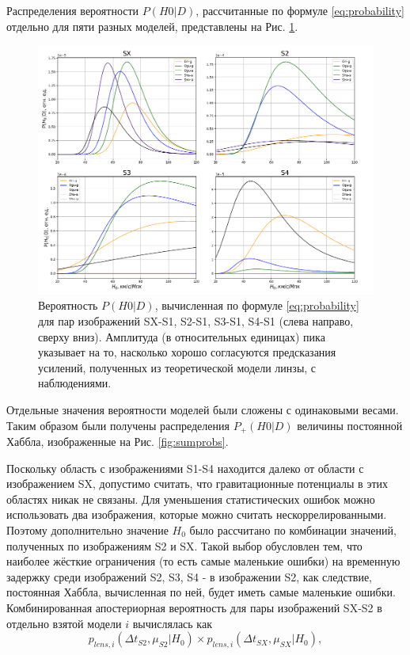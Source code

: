 Распределения вероятности $P( H0 |D)$, рассчитанные по формуле \ref{eq:probability} отдельно для пяти разных моделей, представлены на Рис. \ref{fig:probs}. 

\begin{figure}[H]
    \centering
	\includegraphics[width=0.99\linewidth]{pics/SX234.png}
	\caption{Вероятность $P( H0 |D)$, вычисленная по формуле \eqref{eq:probability} для пар изображений SX-S1, S2-S1, S3-S1, S4-S1 (слева направо, сверху вниз). Амплитуда (в относительных единицах) пика указывает на то, насколько хорошо согласуются предсказания усилений, полученных из теоретической модели линзы, с наблюдениями.}
	\label{fig:probs}
\end{figure}

Отдельные значения вероятности моделей были сложены с одинаковыми весами. Таким образом были получены распределения $P_+( H0 |D)$ величины постоянной Хаббла, изображенные на Рис. \ref{fig:sumprobs}.

Поскольку область с изображениями S1-S4 находится далеко от области с изображением SX, допустимо считать, что гравитационные потенциалы в этих областях никак не связаны. Для уменьшения статистических ошибок можно использовать два изображения, которые можно считать нескоррелированными. Поэтому дополнительно значение $H_0$ было рассчитано по комбинации значений, полученных по изображениям S2 и SX. Такой выбор обусловлен тем, что наиболее жёсткие ограничения (то есть самые маленькие ошибки) на временную задержку среди изображений S2, S3, S4 - в изображении S2, как следствие, постоянная Хаббла, вычисленная по ней, будет иметь самые маленькие ошибки. Комбинированная апостериорная вероятность для пары изображений SX-S2 в отдельно взятой модели $i$ вычислялась как $$ p_{lens, i}(\Delta t_{S2},\mu_{S2}|H_0) \times p_{lens,i}(\Delta t_{SX}, \mu_{SX}|H_0), $$

